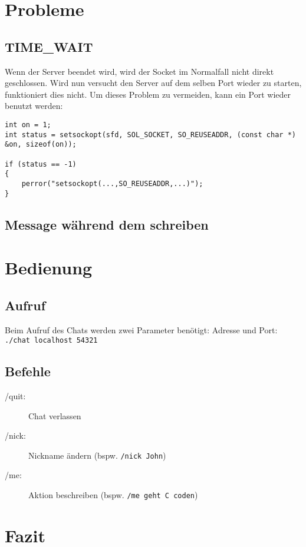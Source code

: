 \documentclass[a4paper]{article}
\begin{document}
\section{Probleme}
\subsection{TIME\_WAIT}
Wenn der Server beendet wird, wird der Socket im Normalfall nicht direkt geschlossen. Wird nun versucht den Server auf dem selben Port wieder zu starten, funktioniert dies nicht. Um dieses Problem zu vermeiden, kann ein Port wieder benutzt werden:

\begin{verbatim}
int on = 1;
int status = setsockopt(sfd, SOL_SOCKET, SO_REUSEADDR, (const char *) &on, sizeof(on));

if (status == -1) 
{   
    perror("setsockopt(...,SO_REUSEADDR,...)");
}
\end{verbatim}

\subsection{Message während dem schreiben}
\section{Bedienung}
\subsection{Aufruf}
Beim Aufruf des Chats werden zwei Parameter benötigt: Adresse und Port:
\texttt{./chat localhost 54321}

\subsection{Befehle}

\begin{description}
    \item[/quit:] Chat verlassen
    \item[/nick:] Nickname ändern (bspw. \texttt{/nick John})
    \item[/me:] Aktion beschreiben (bspw. \texttt{/me geht C coden})
\end{description}

\section{Fazit}
\end{document}
